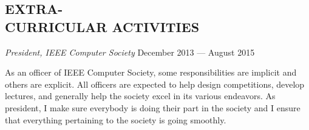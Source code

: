 \documentclass[margin]{res}
\begin{document}
\begin{resume}
  \section{EXTRA-\\CURRICULAR ACTIVITIES}
  {\sl President, IEEE Computer Society}
  \hfill December 2013 --- August 2015 \\
  \vspace{-1.0em}
  \begin{adjustwidth}{1.5em}{0pt}
    As an officer of IEEE Computer Society, some responsibilities are
    implicit and others are explicit. All officers are expected to
    help design competitions, develop lectures, and generally help the
    society excel in its various endeavors.  As president, I make sure
    everybody is doing their part in the society and I ensure that
    everything pertaining to the society is going smoothly.
   \end{adjustwidth}
\end{resume}
\end{document}
